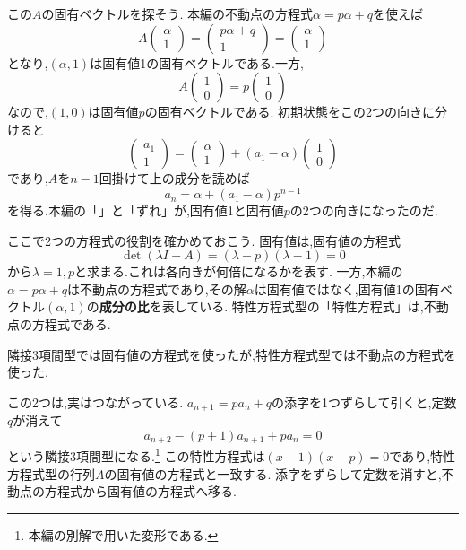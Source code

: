 この$A$の固有ベクトルを探そう.
本編の不動点の方程式$\alpha=p\alpha+q$を使えば
\[
  A\begin{pmatrix}\alpha\\1\end{pmatrix}
  =\begin{pmatrix}p\alpha+q\\1\end{pmatrix}
  =\begin{pmatrix}\alpha\\1\end{pmatrix}
\]
となり,$(\alpha,1)$は固有値1の固有ベクトルである.一方,
\[
  A\begin{pmatrix}1\\0\end{pmatrix}
  =p\begin{pmatrix}1\\0\end{pmatrix}
\]
なので,$(1,0)$は固有値$p$の固有ベクトルである.
初期状態をこの2つの向きに分けると
\[
  \begin{pmatrix}a_1\\1\end{pmatrix}
  =\begin{pmatrix}\alpha\\1\end{pmatrix}
  +(a_1-\alpha)\begin{pmatrix}1\\0\end{pmatrix}
\]
であり,$A$を$n-1$回掛けて上の成分を読めば
\[
  a_n=\alpha+(a_1-\alpha)p^{n-1}
\]
を得る.本編の「」と「ずれ」が,固有値1と固有値$p$の2つの向きになったのだ.

ここで2つの方程式の役割を確かめておこう.
固有値は,固有値の方程式
\[
  \det(\lambda I-A)
  =(\lambda-p)(\lambda-1)=0
\]
から$\lambda=1,p$と求まる.これは各向きが何倍になるかを表す.
一方,本編の$\alpha=p\alpha+q$は不動点の方程式であり,その解$\alpha$は固有値ではなく,固有値1の固有ベクトル$(\alpha,1)$の\textbf{成分の比}を表している.
特性方程式型の「特性方程式」は,不動点の方程式である.

隣接3項間型では固有値の方程式を使ったが,特性方程式型では不動点の方程式を使った.

この2つは,実はつながっている.
$a_{n+1}=pa_n+q$の添字を1つずらして引くと,定数$q$が消えて
\[
  a_{n+2}-(p+1)a_{n+1}+pa_n=0
\]
という隣接3項間型になる.\footnote{本編の別解で用いた変形である.}
この特性方程式は$(x-1)(x-p)=0$であり,特性方程式型の行列$A$の固有値の方程式と一致する.
添字をずらして定数を消すと,不動点の方程式から固有値の方程式へ移る.

